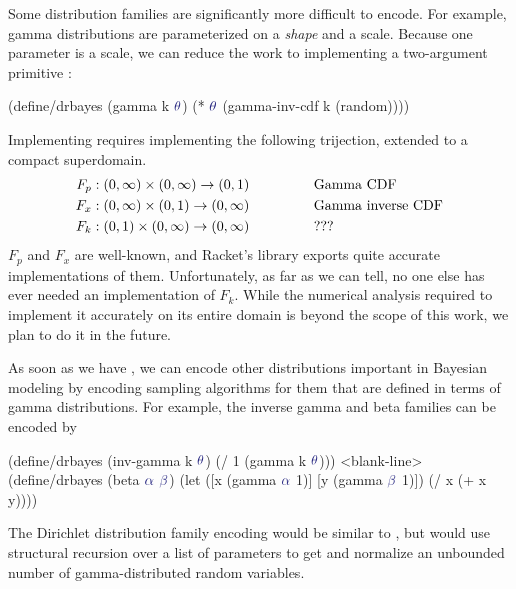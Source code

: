 Some distribution families are significantly more difficult to encode.
For example, gamma distributions are parameterized on a \emph{shape} and a scale.
Because one parameter is a scale, we can reduce the work to implementing a two-argument primitive :
\begin{center}\singlespacing
\begin{schemedisplay}
(define/drbayes (gamma k $\va{\theta}$)
  (* $\va{\theta}$ (gamma-inv-cdf k (random))))
\end{schemedisplay}
\end{center}
Implementing  requires implementing the following trijection, extended to a compact superdomain.
\begin{equation}
\begin{aligned}
	F_p &: (0,{\infty}) \times (0,{\infty}) \to (0,1) \hspace{0.5in}&& \text{Gamma CDF} \\
	F_x &: (0,{\infty}) \times (0,1) \to (0,{\infty}) && \text{Gamma inverse CDF} \\
	F_k &: (0,1) \times (0,\infty) \to (0,{\infty}) && \text{???}
\end{aligned}
\end{equation}
$F_p$ and $F_x$ are well-known, and Racket's  library exports quite accurate implementations of them.
Unfortunately, as far as we can tell, no one else has ever needed an implementation of $F_k$.
While the numerical analysis required to implement it accurately on its entire domain is beyond the scope of this work, we plan to do it in the future.

As soon as we have , we can encode other distributions important in Bayesian modeling by encoding sampling algorithms for them that are defined in terms of gamma distributions.
For example, the inverse gamma and beta families can be encoded by
\begin{center}\singlespacing
\begin{schemedisplay}
(define/drbayes (inv-gamma k $\va{\theta}$)
  (/ 1 (gamma k $\va{\theta}$)))
<blank-line>
(define/drbayes (beta $\va{\alpha}$ $\va{\beta}$)
  (let ([x  (gamma $\va{\alpha}$ 1)]
        [y  (gamma $\va{\beta}$ 1)])
    (/ x (+ x y))))
\end{schemedisplay}
\end{center}
The Dirichlet distribution family encoding would be similar to , but would use structural recursion  over a list of parameters to get and normalize an unbounded number of gamma-distributed random variables.

